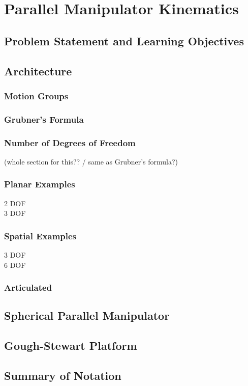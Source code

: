 %

\chapter{Parallel Manipulator Kinematics}

\section{Problem Statement and Learning Objectives}



\section{Architecture}
\subsection{Motion Groups}
\subsection{Grubner's Formula}
\subsection{Number of Degrees of Freedom} (whole section for this?? / same as Grubner's formula?)
\subsection{Planar Examples}
  2 DOF\\
  3 DOF


\subsection{Spatial Examples}
  3 DOF\\
  6 DOF

\subsection{Articulated}
 
\section{Spherical Parallel Manipulator}
\section{Gough-Stewart Platform}


\section{Summary of Notation}


